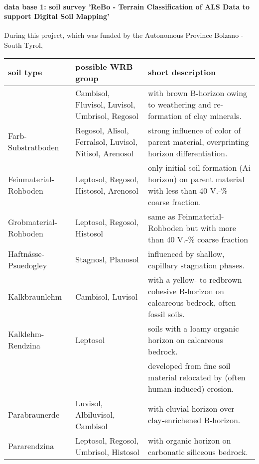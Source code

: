 \documentclass[preprint,12pt,authoryear]{elsarticle}
\begin{document}
\paragraph{data base 1: soil survey 'ReBo - Terrain Classification
of ALS Data to support Digital Soil Mapping'} 
During this project, which was funded by the Autonomous
Province Bolzano - South Tyrol, 
\begin{table}[ht]
\centering
\small
\begin{tabular}{p{2.5cm}p{3.5cm}p{7.0cm}}
  \hline
soil type  & possible WRB group & short description \\ 
  \hline
 \raisebox{-1.5ex}{Braunerde} & {Cambisol, Fluvisol, Luvisol, Umbrisol, Regosol} & with brown B-horizon owing to  weathering and re-formation of clay minerals. \\ 
 
{Farb-Substratboden} & {Regosol, Alisol, Ferralsol, Luvisol, Nitisol, Arenosol} & {strong influence of color of parent material, overprinting horizon differentiation.} \\ 

Feinmaterial-Rohboden & {Leptosol, Regosol, Histosol, Arenosol} &{only initial soil formation (Ai horizon) on parent material with less than 40 V.-\% coarse fraction.} \\ 

Grobmaterial-Rohboden & {Leptosol, Regosol, Histosol} & {same as Feinmaterial-Rohboden but with more than 40 V.-\% coarse fraction} \\ 

Haftnässe-Psuedogley & {Stagnosl, Planosol} & {influenced by shallow, capillary stagnation phases.} \\ 

Kalkbraunlehm & {Cambisol, Luvisol} & {with a yellow- to redbrown cohesive B-horizon on calcareous bedrock, often fossil soils.} \\ 

Kalklehm-Rendzina & {Leptosol} & {soils with a loamy organic horizon on calcareous bedrock.} \\ 

\raisebox{-1.5ex}{Kolluvisol} & \raisebox{-1.5ex}{Anthrosol} & {developed from fine soil material relocated by (often human-induced) erosion.} \\ 

Parabraunerde& {Luvisol, Albiluvisol, Cambisol} & {with eluvial horizon over clay-enrichened B-horizon.} \\ 

Pararendzina & {Leptosol, Regosol, Umbrisol, Histosol} & {with organic horizon on carbonatic siliceous bedrock.} \\ 


\end{tabular}
\end{table}
\end{document}
